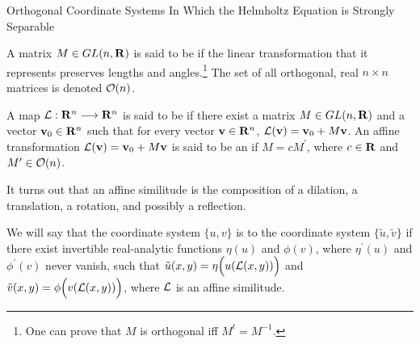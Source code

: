 \begin{section}{Orthogonal Coordinate Systems In Which the Helmholtz Equation is Strongly Separable}
\begin{definition}
\label{orthmatr}
A matrix $M \in GL(n,\mathbf{R})$ is said to be  if the linear transformation that it represents preserves lengths and angles.\footnote{One can prove that $M$ is orthogonal iff $M^t = M^{-1}$.}  The set of all orthogonal, real $n \times n$ matrices is denoted $\mathcal{O}(n)$.
\end{definition}

\begin{definition}
\label{affine}
A map $\mathcal{L}: \mathbf{R}^n \longrightarrow \mathbf{R}^n$ is said to be  if there exist a matrix $M \in GL(n,\mathbf{R})$ and a vector $\mathbf{v}_0 \in \mathbf{R}^n$ such that for every vector $\mathbf{v} \in \mathbf{R}^n$, $\mathcal{L}(\mathbf{v}) = \mathbf{v}_0 + M\mathbf{v}$.  An affine transformation $\mathcal{L}(\mathbf{v}) = \mathbf{v}_0 + M\mathbf{v}$ is said to be an  if $M = c M^\prime$, where $c \in \mathbf{R}$ and $M^\prime \in \mathcal{O}(n)$.
\end{definition}

It turns out that an affine similitude is the composition of a dilation, a translation, a rotation, and possibly a reflection.

\begin{definition}
\label{shapewised}
We will say that the coordinate system $\{ u,v \}$ is  to the coordinate system $\{ \tilde{u},\tilde{v} \}$ if there exist invertible real-analytic functions $\eta(u)$ and $\phi(v)$, where $\eta^\prime(u)$ and $\phi^\prime(v)$ never vanish, such that $\tilde{u}(x,y) = \eta\Big(u(\mathcal{L}(x,y))\Big)$ and $\tilde{v}(x,y) = \phi\Big(v(\mathcal{L}(x,y))\Big)$, where $\mathcal{L}$ is an affine similitude.
\end{definition}

\eex


\end{section}

